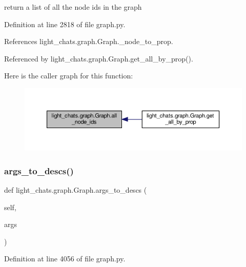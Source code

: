 \begin{DoxyVerb}return a list of all the node ids in the graph\end{DoxyVerb}
 

Definition at line 2818 of file graph.\+py.



References light\+\_\+chats.\+graph.\+Graph.\+\_\+node\+\_\+to\+\_\+prop.



Referenced by light\+\_\+chats.\+graph.\+Graph.\+get\+\_\+all\+\_\+by\+\_\+prop().

Here is the caller graph for this function\+:
\nopagebreak
\begin{figure}[H]
\begin{center}
\leavevmode
\includegraphics[width=350pt]{classlight__chats_1_1graph_1_1Graph_a1200144ee93bfb6e3abae4a41ba10cf0_icgraph}
\end{center}
\end{figure}
\mbox{\label{classlight__chats_1_1graph_1_1Graph_ad0c4f66ad462e7aa45324767c551030a}} 
\subsubsection{\texorpdfstring{args\+\_\+to\+\_\+descs()}{args\_to\_descs()}}
{\footnotesize\ttfamily def light\+\_\+chats.\+graph.\+Graph.\+args\+\_\+to\+\_\+descs (\begin{DoxyParamCaption}\item[{}]{self,  }\item[{}]{args }\end{DoxyParamCaption})}



Definition at line 4056 of file graph.\+py.




